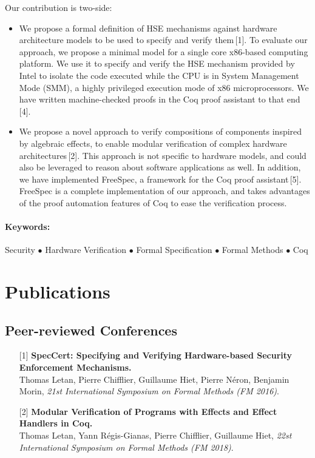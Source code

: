 \documentclass{article}
\begin{document}
Our contribution is two-side:
%
\begin{itemize}
\item We propose a formal definition of HSE mechanisms against hardware
  architecture models to be used to specify and verify them\,[1].
  To evaluate our approach, we propose a minimal model for a single core
  x86-based computing platform.
  We use it to specify and verify the HSE mechanism provided by Intel to isolate
  the code executed while the CPU is in System Management Mode (SMM), a highly
  privileged execution mode of x86 microprocessors.
  We have written machine-checked proofs in the Coq proof assistant to that
  end\,[4].
\item We propose a novel approach to verify compositions of components inspired
  by algebraic effects, to enable modular verification of complex hardware
  architectures\,[2].
  This approach is not specific to hardware models, and could also be leveraged
  to reason about software applications as well.
  In addition, we have implemented FreeSpec, a framework for the Coq proof
  assistant\,[5].
  FreeSpec is a complete implementation of our approach, and takes advantages of
  the proof automation features of Coq to ease the verification process.
\end{itemize}

\paragraph{Keywords:}
%
Security $\bullet$ Hardware Verification $\bullet$ Formal Specification
$\bullet$ Formal Methods $\bullet$ Coq

\section{Publications}

\subsection{Peer-reviewed Conferences}

\begin{itemize}
\item[] [1] \textbf{SpecCert: Specifying and Verifying Hardware-based Security
    Enforcement
    Mechanisms.} \\
  Thomas Letan, Pierre Chifflier, Guillaume Hiet, Pierre Néron, Benjamin Morin,
  \emph{21st International Symposium on Formal Methods (FM 2016)}.
\item[] [2] \textbf{Modular Verification of Programs with Effects and Effect
    Handlers in Coq.} \\
  Thomas Letan, Yann Régis-Gianas, Pierre Chifflier, Guillaume Hiet, \emph{22st
    International Symposium on Formal Methods (FM 2018)}.
\end{itemize}
\end{document}
